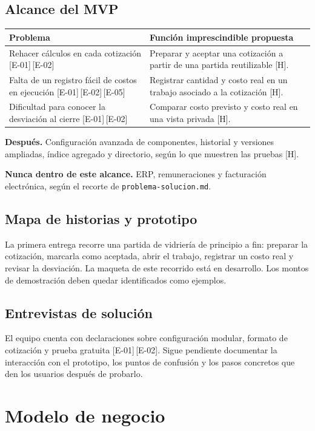 \documentclass[11pt]{article}
\newcommand{\ev}[1]{\textcolor{prblue}{[#1]}}
\newcommand{\hip}{\textcolor{prorange}{[H]}}
\begin{document}
\subsection{Alcance del MVP}
\begin{tabularx}{\linewidth}{@{}XX@{}}
\toprule
\textbf{Problema} & \textbf{Función imprescindible propuesta} \\
\midrule
Rehacer cálculos en cada cotización \ev{E-01}\,\ev{E-02} &
Preparar y aceptar una cotización a partir de una partida reutilizable \hip. \\
Falta de un registro fácil de costos en ejecución \ev{E-01}\,\ev{E-02}\,\ev{E-05} &
Registrar cantidad y costo real en un trabajo asociado a la cotización \hip. \\
Dificultad para conocer la desviación al cierre \ev{E-01}\,\ev{E-02} &
Comparar costo previsto y costo real en una vista privada \hip. \\
\bottomrule
\end{tabularx}

\textbf{Después.} Configuración avanzada de componentes, historial y
versiones ampliadas, índice agregado y directorio, según lo que muestren
las pruebas \hip.

\textbf{Nunca dentro de este alcance.} ERP, remuneraciones y facturación
electrónica, según el recorte de \texttt{problema-solucion.md}.

\subsection{Mapa de historias y prototipo}
La primera entrega recorre una partida de vidriería de principio a fin:
preparar la cotización, marcarla como aceptada, abrir el trabajo,
registrar un costo real y revisar la desviación. La maqueta de este
recorrido está en desarrollo. Los montos de demostración deben quedar
identificados como ejemplos.

\subsection{Entrevistas de solución}
El equipo cuenta con declaraciones sobre configuración modular, formato
de cotización y prueba gratuita \ev{E-01}\,\ev{E-02}. Sigue pendiente
documentar la interacción con el prototipo, los puntos de confusión y
los pasos concretos que den los usuarios después de probarlo.

\section{Modelo de negocio}
\end{document}
